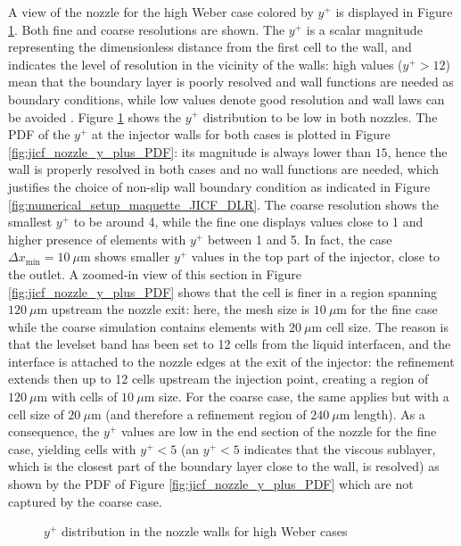 A view of the nozzle for the high Weber case colored by $y^+$ is displayed in Figure \ref{fig:injector_visualization_y_plus}. Both fine and coarse resolutions are shown. The $y^+$ is a scalar magnitude representing the dimensionless distance from the first cell to the wall, and indicates the level of resolution in the vicinity of the walls: high values ($y^+ > 12$) mean that the boundary layer is poorly resolved and wall functions are needed as boundary conditions, while low values denote good resolution and wall laws can be avoided . Figure \ref{fig:injector_visualization_y_plus} shows the $y^+$ distribution to be low in both nozzles. The PDF of the $y^+$ at the injector walls for both cases is plotted in Figure \ref{fig:jicf_nozzle_y_plus_PDF}: its magnitude is always lower than $15$, hence the wall is properly resolved in both cases and no wall functions are needed, which justifies the choice of non-slip wall boundary condition as indicated in Figure \ref{fig:numerical_setup_maquette_JICF_DLR}.  The coarse resolution shows the smallest $y^+$ to be around 4, while the fine one displays values close to 1 and higher presence of elements with $y^+$ between 1 and 5. In fact, the case $\Delta x_\mathrm{min} = 10 ~\mu$m shows smaller $y^+$ values in the top part of the injector, close to the outlet. A zoomed-in view of this section in Figure \ref{fig:jicf_nozzle_y_plus_PDF} shows that the cell is finer in a region spanning $120~ \mu$m upstream the nozzle exit: here, the mesh size is $10~ \mu$m for the fine case while the coarse simulation contains elements with $20 ~\mu$m cell size. The reason is that the levelset band has been set to 12 cells from the liquid interfacen, and the interface is attached to the nozzle edges at the exit of the injector: the refinement extends then up to 12 cells upstream the injection point, creating a region of $120~\mu$m with cells of $10~\mu$m size. For the coarse case, the same applies but with a cell size of $20~\mu$m (and therefore a refinement region of $240~\mu$m length). As a consequence, the $y^+$ values are low in the end section of the nozzle for the fine case, yielding cells with $y^+ < 5$ (an $y^+ < 5$ indicates that the viscous sublayer, which is the closest part of the boundary layer close to the wall, is resolved) as shown by the PDF of Figure \ref{fig:jicf_nozzle_y_plus_PDF} which are not captured by the coarse case. 


\begin{figure}[ht]
\centering
{}
\caption{$y^+$ distribution in the nozzle walls for high Weber cases}
\label{fig:injector_visualization_y_plus}
\end{figure}

